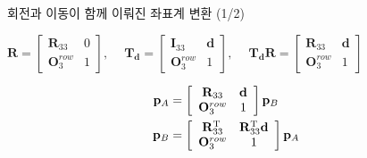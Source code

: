 \begin{frame}[fragile]{회전과 이동이 함께 이뤄진 좌표계 변환 (1/2)}

$ 
\mathbf R = \left [ \begin{array}{cc} \mathbf R_{33} & 0 \\ \mathbf O_3^{row}  & 1 \end{array} \right ]
,~~~~$
$ 
\mathbf T_{\mathbf d} = \left [ \begin{array}{cc} \mathbf I_{33} & \mathbf d \\ \mathbf O_3^{row} & 1 \end{array} \right ]
,~~~~$
$ 
\mathbf T_{\mathbf d} \mathbf R = \left [ \begin{array}{cc} \mathbf R_{33} & \mathbf d \\ \mathbf O_3^{row} & 1 \end{array} \right ]
$


\begin{eqnarray}
\mathbf p_A &= 
\left [ \begin{array}{cc} \mathbf R_{33} & \mathbf d \\ \mathbf O_3^{row} & 1 \end{array} \right ]
\mathbf p_B & \nonumber \\
\mathbf p_B &=  
\left [ \begin{array}{cc} \mathbf R_{33}^{\rm T} &  \mathbf R_{33}^{\rm T} \mathbf d \\ \mathbf O_3^{row} & 1 \end{array} \right ]
\mathbf p_A  \nonumber
\end{eqnarray}

\end{frame}
